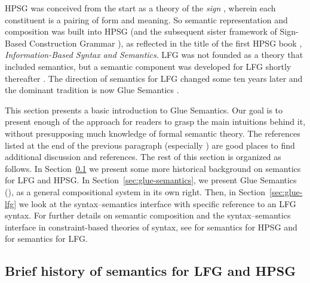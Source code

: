HPSG  was conceived from the
start as  a theory of the \textit{sign} \citep{Saussure16a-Fr}, 
wherein each constituent is a pairing of form and meaning.  
So semantic representation and composition  was built into HPSG (and the subsequent sister framework of Sign-Based Construction Grammar \citealt{BS2012a-ed}), as reflected in the title of the first HPSG
book \citep{pollard;sag87}, \textit{Information-Based Syntax and
  Semantics}.  LFG was not founded as a theory that included semantics, but a semantic component was developed for LFG shortly thereafter \citep{halvorsen83}.  The direction of semantics for LFG changed some ten years later and the dominant tradition is now Glue Semantics \citep{dalrymple;ea93,dalrymple99,Dalrymple2001a-u,asudeh-lpr,dalrymple;ea19}.  

This section presents a basic introduction to Glue Semantics. 
Our goal is to present enough of the approach for readers to grasp the main intuitions behind it, without presupposing much knowledge of formal semantic theory.  The references listed at the end of the previous paragraph (especially \citet{dalrymple;ea19}) are good places to find additional discussion and references.  
The rest of this section is organized as follows. In Section~\ref{sec:background} we present some more historical background on semantics for LFG and HPSG.  In Section~\ref{sec:glue-semantics}, we present Glue Semantics (\glue), as a general compositional system in its own right. Then, in Section~\ref{sec:glue-lfg} we look at the syntax--semantics interface with specific reference to an LFG syntax. For further details on semantic composition and the syntax--semantics interface in constraint-based theories of syntax, see \citet{koenig;richter-tv} for semantics for HPSG and \citet{asudeh-lfg-glue} for semantics for LFG.

\subsection{Brief history of semantics for LFG and HPSG}
\label{sec:background}

